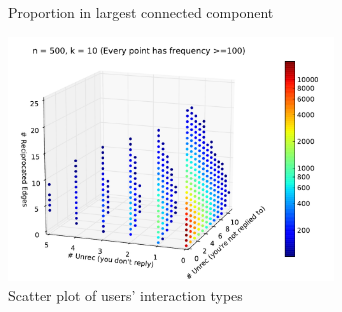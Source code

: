 \documentclass[conference]{IEEEtran}
\begin{document}
\begin{figure}[!t]
\centering
{}                
\caption{Proportion in largest connected component}
\label{fig_rur_lcc}
\end{figure}

\begin{figure}[!t]
\centering
\includegraphics[width=3.4in]{scatter3}
\caption{Scatter plot of users' interaction types}
\label{fig_rur_sca2}
\end{figure}

%
%
\end{document}
